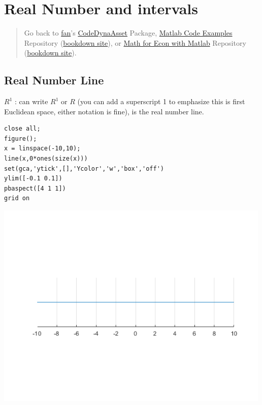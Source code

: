 \documentclass[
]{book}
\begin{document}
\hypertarget{real-number-and-intervals}{%
\section{Real Number and intervals}\label{real-number-and-intervals}}

\begin{quote}
Go back to \href{http://fanwangecon.github.io/}{fan}'s \href{https://fanwangecon.github.io/CodeDynaAsset/}{CodeDynaAsset} Package, \href{https://fanwangecon.github.io/M4Econ/}{Matlab Code Examples} Repository (\href{https://fanwangecon.github.io/M4Econ/bookdown}{bookdown site}), or \href{https://fanwangecon.github.io/Math4Econ/}{Math for Econ with Matlab} Repository (\href{https://fanwangecon.github.io/Math4Econ/bookdown}{bookdown site}).
\end{quote}

\hypertarget{real-number-line}{%
\subsection{Real Number Line}\label{real-number-line}}

\({{R^1 }}\) : can write \(R^1\) or \(R\) (you can add a superscript 1 to
emphasize this is first Euclidean space, either notation is fine), is
the real number line.

\begin{verbatim}
close all;
figure();
x = linspace(-10,10);
line(x,0*ones(size(x)))
set(gca,'ytick',[],'Ycolor','w','box','off')
ylim([-0.1 0.1])
pbaspect([4 1 1])
grid on
\end{verbatim}

\includegraphics[width=5.20833in,height=\textheight]{img/realnumber_images/figure_0.png}
\end{document}
